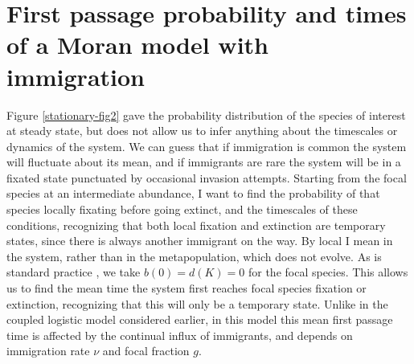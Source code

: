 \section{First passage probability and times of a Moran model with immigration}
Figure \ref{stationary-fig2} gave the probability distribution of the species of interest at steady state, but does not allow us to infer anything about the timescales or dynamics of the system. 
We can guess that if immigration is common the system will fluctuate about its mean, and if immigrants are rare the system will be in a fixated state punctuated by occasional invasion attempts. 
Starting from the focal species at an intermediate abundance, I want to find the probability of that species locally fixating before going extinct, and the timescales of these conditions, recognizing that both local fixation and extinction are temporary states, since there is always another immigrant on the way. 
By local I mean in the system, rather than in the metapopulation, which does not evolve. 
As is standard practice \cite{Nisbet1982,Iyer-Biswas2015}, we take $b(0)=d(K)=0$ for the focal species. 
This allows us to find the mean time the system first reaches focal species fixation or extinction, recognizing that this will only be a temporary state. 
Unlike in the coupled logistic model considered earlier, in this model this mean first passage time is affected by the continual influx of immigrants, and depends on immigration rate $\nu$ and focal fraction $g$. 

